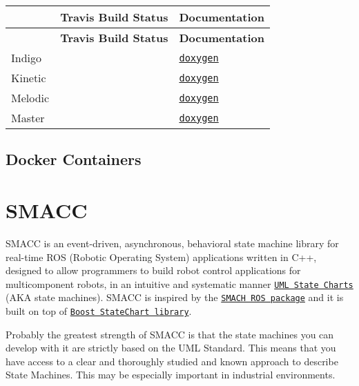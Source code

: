 \tabulinesep=1mm
\begin{longtabu} spread 0pt [c]{*3{|X[-1]}|}
\hline
{}&{\bf Travis Build Status }&{\bf Documentation  }\\
\endfirsthead
\hline
\endfoot
\hline
{}&{\bf Travis Build Status }&{\bf Documentation  }\\
\endhead
Indigo & &\href{https://reelrbtx.github.io/SMACC/indigo-devel/html/md_README.html}{\tt doxygen} \\
Kinetic & &\href{https://reelrbtx.github.io/SMACC/kinetic-devel/html/md_README.html}{\tt doxygen} \\
Melodic & &\href{https://reelrbtx.github.io/SMACC/melodic-devel/html/md_README.html}{\tt doxygen} \\
Master & &\href{https://reelrbtx.github.io/SMACC/master/html/namespaces.html}{\tt doxygen} \\
\end{longtabu}


\subsection*{Docker Containers}

\href{https://hub.docker.com/r/pabloinigoblasco/smacc/}{\tt } \href{https://hub.docker.com/r/pabloinigoblasco/smacc/}{\tt } \href{https://registry.hub.docker.com/pabloinigoblasco/smacc/}{\tt }

\section*{S\+M\+A\+CC}

S\+M\+A\+CC is an event-\/driven, asynchronous, behavioral state machine library for real-\/time R\+OS (Robotic Operating System) applications written in C++, designed to allow programmers to build robot control applications for multicomponent robots, in an intuitive and systematic manner \href{http://sce.uhcl.edu/helm/rationalunifiedprocess/process/modguide/md_stadm.htm}{\tt U\+ML State Charts} (A\+KA state machines). S\+M\+A\+CC is inspired by the \href{http://wiki.ros.org/smach}{\tt S\+M\+A\+CH R\+OS package} and it is built on top of \href{https://www.boost.org/doc/libs/1_53_0/libs/statechart/doc/index.html}{\tt Boost State\+Chart library}.

Probably the greatest strength of S\+M\+A\+CC is that the state machines you can develop with it are strictly based on the U\+ML Standard. This means that you have access to a clear and thoroughly studied and known approach to describe State Machines. This may be especially important in industrial environments.

